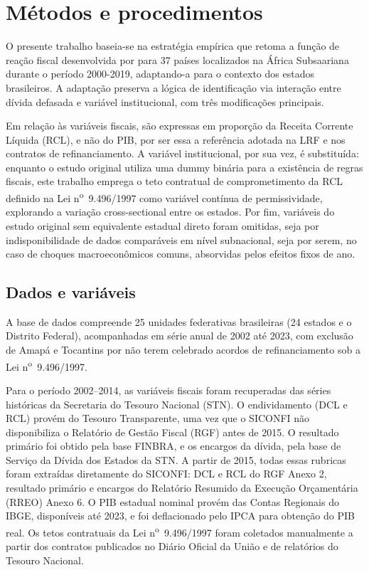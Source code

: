 \chapter{Métodos e procedimentos}
\label{chap:metodologia}

O presente trabalho baseia-se na estratégia empírica que retoma a função de reação fiscal desenvolvida por  para 37 países localizados na África Subsaariana durante o período 2000-2019, adaptando-a para o contexto dos estados brasileiros. A adaptação preserva a lógica de identificação via interação entre dívida defasada e variável institucional, com três modificações principais.

Em relação às variáveis fiscais, são expressas em proporção da Receita Corrente Líquida (RCL), e não do PIB, por ser essa a referência adotada na LRF e nos contratos de refinanciamento. A variável institucional, por sua vez, é substituída: enquanto o estudo original utiliza uma dummy binária para a existência de regras fiscais, este trabalho emprega o teto contratual de comprometimento da RCL definido na Lei n\textsuperscript{o}~9.496/1997 como variável contínua de permissividade, explorando a variação cross-sectional entre os estados. Por fim, variáveis do estudo original sem equivalente estadual direto foram omitidas, seja por indisponibilidade de dados comparáveis em nível subnacional, seja por serem, no caso de choques macroeconômicos comuns, absorvidas pelos efeitos fixos de ano.

\section{Dados e variáveis}
\label{sec:dados}

A base de dados compreende 25 unidades federativas brasileiras (24 estados e o Distrito Federal), acompanhadas em série anual de 2002 até 2023, com exclusão de Amapá e Tocantins por não terem celebrado acordos de refinanciamento sob a Lei n\textsuperscript{o}~9.496/1997.

Para o período 2002--2014, as variáveis fiscais foram recuperadas das séries históricas da Secretaria do Tesouro Nacional (STN). O endividamento (DCL e RCL) provém do Tesouro Transparente, uma vez que o SICONFI não disponibiliza o Relatório de Gestão Fiscal (RGF) antes de 2015. O resultado primário foi obtido pela base FINBRA, e os encargos da dívida, pela base de Serviço da Dívida dos Estados da STN. A partir de 2015, todas essas rubricas foram extraídas diretamente do SICONFI: DCL e RCL do RGF Anexo 2, resultado primário e encargos do Relatório Resumido da Execução Orçamentária (RREO) Anexo 6. O PIB estadual nominal provém das Contas Regionais do IBGE, disponíveis até 2023, e foi deflacionado pelo IPCA para obtenção do PIB real. Os tetos contratuais da Lei n\textsuperscript{o}~9.496/1997 foram coletados manualmente a partir dos contratos publicados no Diário Oficial da União e de relatórios do Tesouro Nacional.

